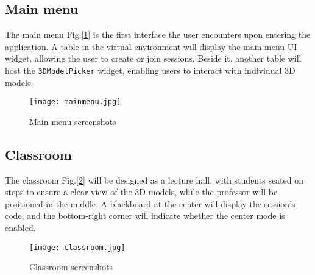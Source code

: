\subsection{Main menu}
\noindent
The main menu Fig.[\ref{fig:mainmenuRoom}] is the first interface the user encounters upon entering the application. A table in the virtual environment will display the main menu \ac{UI} widget, allowing the user to create or join sessions.
Beside it, another table will host the \texttt{3DModelPicker} widget, enabling users to interact with individual 3D models.

\begin{figure}[ht]
    \centering
    \texttt{[image: mainmenu.jpg]}
    \caption{Main menu screenshots}
    \label{fig:mainmenuRoom}
\end{figure}
\subsection{Classroom}
\noindent
The classroom Fig.[\ref{fig:classroom}] will be designed as a lecture hall, with students seated on steps to ensure a clear view of the 3D models, while the professor will be positioned in the middle.
A blackboard at the center will display the session's code, and the bottom-right corner will indicate whether the center mode is enabled.

\begin{figure}[ht]
    \centering
    \texttt{[image: classroom.jpg]}
    \caption{Classroom screenshots}
    \label{fig:classroom}
\end{figure}

